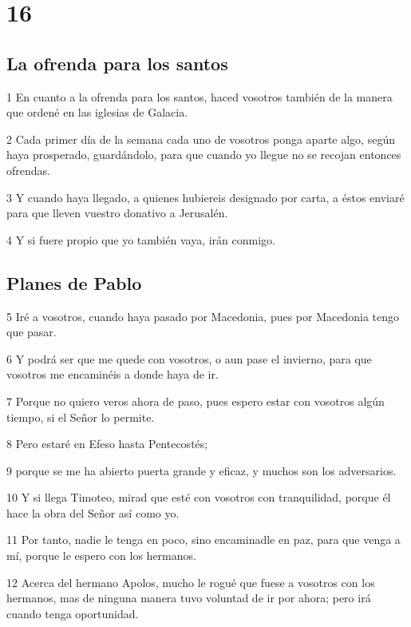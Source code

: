 \chapter{16}

\section*{La ofrenda para los santos}

\par 1 En cuanto a la ofrenda para los santos, haced vosotros también de la manera que ordené en las iglesias de Galacia.
\par 2 Cada primer día de la semana cada uno de vosotros ponga aparte algo, según haya prosperado, guardándolo, para que cuando yo llegue no se recojan entonces ofrendas.
\par 3 Y cuando haya llegado, a quienes hubiereis designado por carta, a éstos enviaré para que lleven vuestro donativo a Jerusalén.
\par 4 Y si fuere propio que yo también vaya, irán conmigo.

\section*{Planes de Pablo}

\par 5 Iré a vosotros, cuando haya pasado por Macedonia, pues por Macedonia tengo que pasar.
\par 6 Y podrá ser que me quede con vosotros, o aun pase el invierno, para que vosotros me encaminéis a donde haya de ir.
\par 7 Porque no quiero veros ahora de paso, pues espero estar con vosotros algún tiempo, si el Señor lo permite.
\par 8 Pero estaré en Efeso hasta Pentecostés;
\par 9 porque se me ha abierto puerta grande y eficaz, y muchos son los adversarios.
\par 10 Y si llega Timoteo, mirad que esté con vosotros con tranquilidad, porque él hace la obra del Señor así como yo.
\par 11 Por tanto, nadie le tenga en poco, sino encaminadle en paz, para que venga a mí, porque le espero con los hermanos.
\par 12 Acerca del hermano Apolos, mucho le rogué que fuese a vosotros con los hermanos, mas de ninguna manera tuvo voluntad de ir por ahora; pero irá cuando tenga oportunidad.

